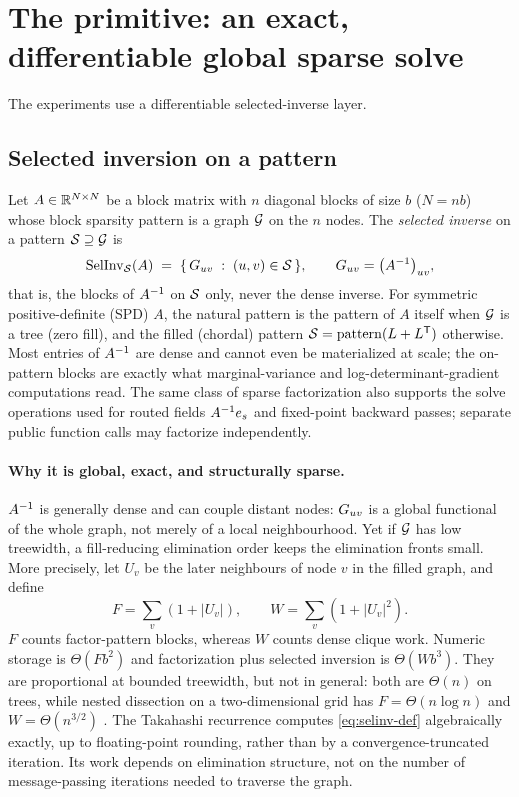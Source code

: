 \section{The primitive: an exact, differentiable global sparse solve}
\label{sec:primitive}

The experiments use a differentiable selected-inverse layer.

\subsection{Selected inversion on a pattern}
\label{sec:setup}

Let $A \in \mathbb{R}^{N\times N}$ be a block matrix with $n$ diagonal blocks of size
$b$ ($N = nb$) whose block sparsity pattern is a graph $\mathcal{G}$ on the $n$ nodes.
The \emph{selected inverse} on a pattern $\mathcal{S} \supseteq \mathcal{G}$ is
\begin{equation}
  \operatorname{SelInv}_{\mathcal{S}}(A) \;=\; \{\, G_{uv} \;:\; (u,v)\in\mathcal{S} \,\},
  \qquad G_{uv} = \big(A^{-1}\big)_{uv},
  \label{eq:selinv-def}
\end{equation}
that is, the blocks of $A^{-1}$ on $\mathcal{S}$ only, never the dense inverse. For
symmetric positive-definite (SPD) $A$, the natural pattern is the pattern of
$A$ itself when $\mathcal{G}$ is a tree
(zero fill), and the filled (chordal) pattern
$\mathcal{S} = \mathrm{pattern}(L+L^{\mathsf{T}})$ otherwise. Most entries of $A^{-1}$ are dense
and cannot even be materialized at scale; the on-pattern blocks are exactly
what marginal-variance and log-determinant-gradient computations read. The
same class of sparse factorization also supports the solve operations used for
routed fields $A^{-1}e_s$ and fixed-point backward passes; separate public function
calls may factorize independently.

\paragraph{Why it is global, exact, and structurally sparse.}
$A^{-1}$ is generally dense and can couple distant nodes:
$G_{uv}$ is a global functional of the whole graph, not merely of a
local neighbourhood. Yet if $\mathcal{G}$ has low treewidth, a fill-reducing
elimination order keeps the elimination fronts small. More precisely, let
$U_v$ be the later neighbours of node $v$ in the
filled graph, and define
\[
  F=\sum_v(1+|U_v|),\qquad W=\sum_v(1+|U_v|^2).
\]
$F$ counts factor-pattern blocks, whereas $W$ counts dense clique work.
Numeric storage is $\Theta(Fb^2)$ and factorization plus selected inversion is
$\Theta(Wb^3)$. They are proportional at bounded treewidth, but not in
general: both are $\Theta(n)$ on trees, while nested dissection on a
two-dimensional grid has $F=\Theta(n\log n)$ and
$W=\Theta(n^{3/2})$ \citep{george1973nested}. The Takahashi recurrence
computes \eqref{eq:selinv-def} algebraically exactly, up to floating-point
rounding, rather than by a convergence-truncated iteration. Its work depends
on elimination structure, not on the number of message-passing iterations
needed to traverse the graph.

